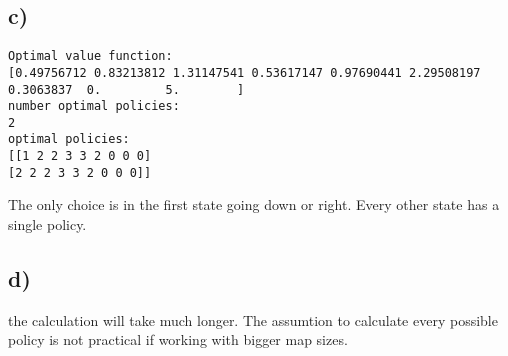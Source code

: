 \documentclass[a4paper]{article}
\begin{document}
\subsection*{c)}
\begin{lstlisting}
Optimal value function:
[0.49756712 0.83213812 1.31147541 0.53617147 0.97690441 2.29508197
0.3063837  0.         5.        ]
number optimal policies:
2
optimal policies:
[[1 2 2 3 3 2 0 0 0]
[2 2 2 3 3 2 0 0 0]]
\end{lstlisting}

The only choice is in the first state going down or right. Every other state has a single policy.


\subsection*{d)}
the calculation will take much longer. The assumtion to calculate every possible policy is not practical if working with bigger map sizes.
\end{document}
